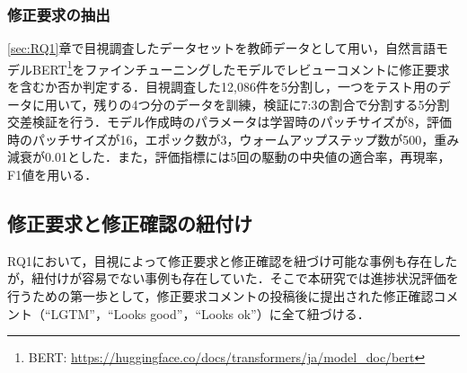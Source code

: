 \documentclass[T,J]{fose} %
\newcommand{\todo}[1]{\colorbox{yellow}{{\bf TODO}:}{\color{red} {\textbf{[#1]}}}}
\begin{document}
\subsubsection{修正要求の抽出}
\ref{sec:RQ1}章で目視調査したデータセットを教師データとして用い，自然言語モデルBERT\footnote{BERT: \url{https://huggingface.co/docs/transformers/ja/model_doc/bert}}をファインチューニングしたモデルでレビューコメントに修正要求を含むか否か判定する．目視調査した12,086件を5分割し，一つをテスト用のデータに用いて，残りの4つ分のデータを訓練，検証に7:3の割合で分割する5分割交差検証を行う．モデル作成時のパラメータは学習時のパッチサイズが8，評価時のパッチサイズが16，エポック数が3，ウォームアップステップ数が500，重み減衰が0.01とした．また，評価指標には5回の駆動の中央値の適合率，再現率，F1値を用いる．


\subsection{修正要求と修正確認の紐付け}
RQ1において，目視によって修正要求と修正確認を紐づけ可能な事例も存在したが，紐付けが容易でない事例も存在していた．そこで本研究では進捗状況評価を行うための第一歩として，修正要求コメントの投稿後に提出された修正確認コメント（``LGTM''，``Looks good''，``Looks ok''）に全て紐づける．
\end{document}

